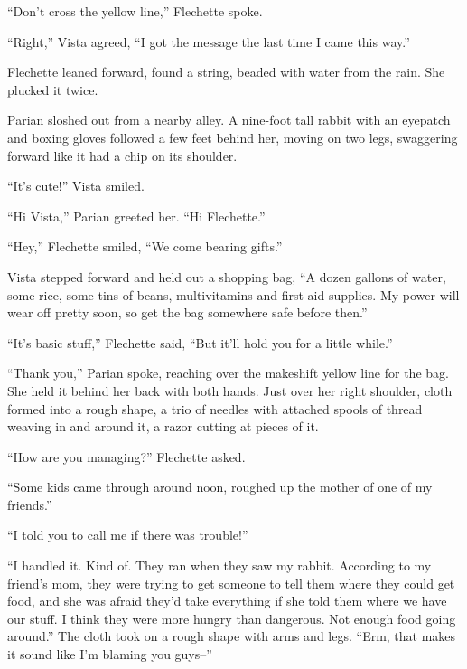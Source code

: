 





``Don't cross the yellow line,'' Flechette spoke.



``Right,'' Vista agreed, ``I got the message the last time I came this way.''



Flechette leaned forward, found a string, beaded with water from the rain.  She plucked it twice.



Parian sloshed out from a nearby alley.  A nine-foot tall rabbit with an eyepatch and boxing gloves followed a few feet behind her, moving on two legs, swaggering forward like it had a chip on its shoulder.



``It's cute!'' Vista smiled.



``Hi Vista,'' Parian greeted her.  ``Hi Flechette.''



``Hey,'' Flechette smiled, ``We come bearing gifts.''



Vista stepped forward and held out a shopping bag, ``A dozen gallons of water, some rice, some tins of beans, multivitamins and first aid supplies.  My power will wear off pretty soon, so get the bag somewhere safe before then.''



``It's basic stuff,'' Flechette said, ``But it'll hold you for a little while.''



``Thank you,'' Parian spoke, reaching over the makeshift yellow line for the bag.  She held it behind her back with both hands.  Just over her right shoulder, cloth formed into a rough shape, a trio of needles with attached spools of thread weaving in and around it, a razor cutting at pieces of it.



``How are you managing?''  Flechette asked.



``Some kids came through around noon, roughed up the mother of one of my friends.''



``I told you to call me if there was trouble!''



``I handled it.  Kind of.  They ran when they saw my rabbit.  According to my friend's mom, they were trying to get someone to tell them where they could get food, and she was afraid they'd take everything if she told them where we have our stuff.  I think they were more hungry than dangerous.  Not enough food going around.''  The cloth took on a rough shape with arms and legs.  ``Erm, that makes it sound like I'm blaming you guys--''



